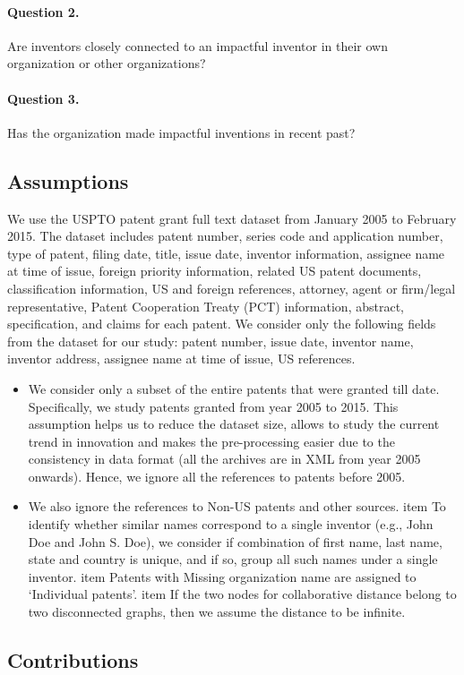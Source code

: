 \paragraph{Question  2.} Are inventors closely connected to an impactful
inventor in their own organization or other organizations? %

\paragraph{Question  3.} Has the organization made impactful inventions in
recent past? %


\subsection{Assumptions}

We use the USPTO patent grant full text dataset from January 2005 to February
2015.  The dataset includes patent number, series code and application number,
type of patent, filing date, title, issue date, inventor information, assignee
name at time of issue, foreign priority information, related US patent
documents, classification information, US and foreign references, attorney,
agent or firm/legal representative, Patent Cooperation Treaty (PCT)
information, abstract, specification, and claims for each patent. We consider
only the following fields from the dataset for our study: patent number, issue
date, inventor name, inventor address, assignee name at time of issue, US
references.

	\begin{itemize}
		\item We consider only a subset of the entire patents that were granted till
		date. Specifically, we study patents granted from year 2005 to 2015. This
		assumption helps us to reduce the dataset size, allows to study the current
		trend in innovation and makes the pre-processing easier due to the
		consistency in data format (all the archives are in XML from year 2005
		onwards). Hence, we ignore all the references to patents before 2005.

		\item We also ignore the references to Non-US patents and other sources. item
		To identify whether similar names correspond to a single inventor (e.g., John
		Doe and John S. Doe), we consider if combination of first name, last name,
		state and country is unique, and if so, group all such names under a single
		inventor.  item Patents with Missing organization name  are assigned to
		`Individual patents'. item If the two nodes for collaborative distance belong
		to two disconnected graphs, then we assume the distance to be infinite.
	\end{itemize}


\subsection{Contributions}
